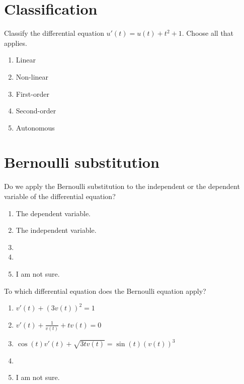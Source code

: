 \documentclass[aspectratio=169, t, 14pt]{beamer}
\begin{document}
\section{Classification}

\begin{frame}[t]
  Classify the differential equation \(u'(t) = u(t) + t^{2} + 1\). Choose all that applies.

  \begin{enumerate}
    \item Linear
    \item Non-linear
    \item First-order
    \item Second-order
    \item Autonomous
  \end{enumerate}
\end{frame}

\section{Bernoulli substitution}

\begin{frame}[t]
  Do we apply the Bernoulli substitution to the independent or the dependent variable of the differential equation?

  \begin{enumerate} 
    \item The dependent variable.
    \item The independent variable.
    \item 
    \item 
    \item I am not sure.
  \end{enumerate} 
\end{frame}

\begin{frame}[t]
  To which differential equation does the Bernoulli equation apply?

  \begin{enumerate} 
    \item \(v'(t) + (3v(t))^{2} = 1\)
    \item \(v'(t) + \frac{1}{v(t)} + tv(t) = 0\)
    \item \(\cos(t) v'(t) + \sqrt{3tv(t)} = \sin(t)\left( v(t) \right)^{3}\)
    \item 
    \item I am not sure.
  \end{enumerate} 
\end{frame}
\end{document}
